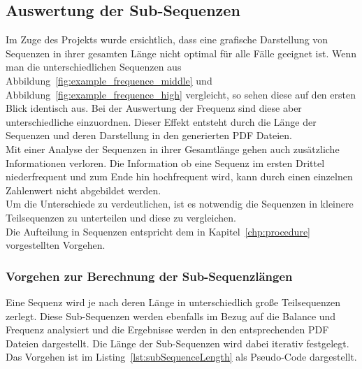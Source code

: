 \subsection{Auswertung der Sub-Sequenzen}
Im Zuge des Projekts wurde ersichtlich, dass eine grafische Darstellung von Sequenzen in ihrer gesamten Länge nicht optimal für alle Fälle geeignet ist.
Wenn man die unterschiedlichen Sequenzen aus Abbildung~\ref{fig:example_frequence_middle} und Abbildung~\ref{fig:example_frequence_high} vergleicht, so sehen diese auf den ersten Blick identisch aus.
Bei der Auswertung der Frequenz sind diese aber unterschiedliche einzuordnen.
Dieser Effekt entsteht durch die Länge der Sequenzen und deren Darstellung in den generierten PDF Dateien.\\
Mit einer Analyse der Sequenzen in ihrer Gesamtlänge gehen auch zusätzliche Informationen verloren. Die Information ob eine Sequenz im ersten Drittel niederfrequent und zum Ende hin hochfrequent wird, kann durch einen einzelnen Zahlenwert nicht abgebildet werden.\\
Um die Unterschiede zu verdeutlichen, ist es notwendig die Sequenzen in kleinere Teilsequenzen zu unterteilen und diese zu vergleichen.\\
Die Aufteilung in Sequenzen entspricht dem in Kapitel~\ref{chp:procedure} vorgestellten Vorgehen.

\subsubsection{Vorgehen zur Berechnung der Sub-Sequenzlängen}
Eine Sequenz wird je nach deren Länge in unterschiedlich große Teilsequenzen zerlegt. Diese Sub-Sequenzen werden ebenfalls im Bezug auf die Balance und Frequenz analysiert und die Ergebnisse werden in den entsprechenden PDF Dateien dargestellt.
Die Länge der Sub-Sequenzen wird dabei iterativ festgelegt. Das Vorgehen ist im Listing~\ref{lst:subSequenceLength} als Pseudo-Code dargestellt.\\

{}{}

